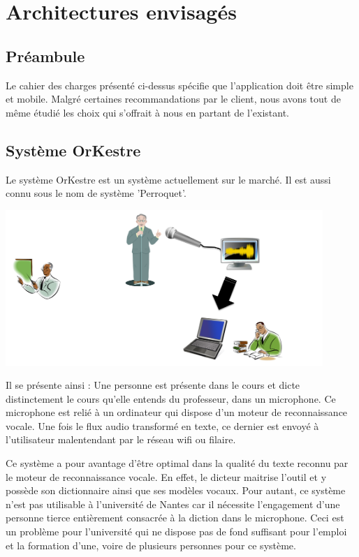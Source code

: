 \chapter{Architectures envisagés}

\section{Préambule}
Le cahier des charges présenté ci-dessus spécifie que l'application doit être
simple et mobile. Malgré certaines recommandations par le client, nous avons
tout de même étudié les choix qui s'offrait à nous en partant de l'existant.

\section{Système OrKestre}

Le système OrKestre est un système actuellement sur le marché. Il est aussi
connu sous le nom de système 'Perroquet'.

\includegraphics[width=12cm]{img/orKestre.png} 

Il se présente ainsi : Une personne est présente dans le cours et dicte distinctement le cours qu'elle entends du professeur, dans un microphone. Ce microphone est relié à un ordinateur qui dispose d'un moteur de reconnaissance vocale. Une fois le flux audio transformé en texte, ce dernier est envoyé à l'utilisateur malentendant par le réseau wifi ou filaire.

Ce système a pour avantage d'être optimal dans la qualité du texte reconnu par le moteur de reconnaissance vocale. En effet, le dicteur maitrise l'outil et y possède son dictionnaire ainsi que ses modèles vocaux. 
Pour autant, ce système n'est pas utilisable à l'université de Nantes car il nécessite l'engagement d'une personne tierce entièrement consacrée à la diction dans le microphone. Ceci est un problème pour l'université qui ne dispose pas de fond suffisant pour l'emploi et la formation d'une, voire de plusieurs personnes pour ce système.

